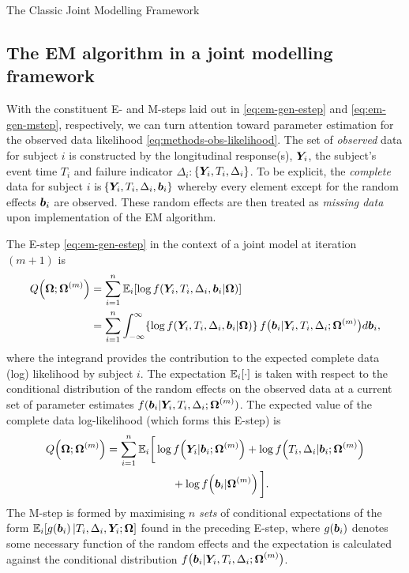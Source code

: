 \begin{chapter}{\label{cha:methods-classic}The Classic Joint Modelling Framework}
 \subsection{\label{sec:jm-em-jm}The EM algorithm in a joint modelling framework} 
  With the constituent E- and M-steps laid out in \eqref{eq:em-gen-estep} and \eqref{eq:em-gen-mstep}, respectively, we can turn attention toward parameter estimation for the observed data likelihood \eqref{eq:methods-obs-likelihood}. \newline
  The set of \textit{observed} data for subject $i$ is constructed by the longitudinal response(s), $\bm{Y}_i$, the subject's event time $T_i$ and failure indicator $\Delta_i$: $\!\left\{\bm{Y}_i,T_i,\Delta_i\right\}$. To be explicit, the \textit{complete} data for subject $i$ is $\!\left\{\bm{Y}_i,T_i,\Delta_i,\bm{b}_i\right\}$ whereby every element except for the random effects $\bm{b}_i$ are observed. These random effects are then treated as \textit{missing data} upon implementation of the EM algorithm.
  
  The E-step \eqref{eq:em-gen-estep} in the context of a joint model at iteration $(m+1)$ is
  \begin{align*}
    Q\!\left(\bm{\mathrm{\Omega}};\bm{\mathrm{\Omega}}^{(m)}\right)&=\sum_{i=1}^n\mathbb{E}_i\!\left[\log f(\bm{Y}_i, T_i, \Delta_i, \bm{b}_i|\bm{\mathrm{\Omega}})\right]\\
    &=\sum_{i=1}^n\int_{-\infty}^\infty\!\left\{\log f(\bm{Y}_i, T_i, \Delta_i, \bm{b}_i|\bm{\mathrm{\Omega}})\right\} f\big(\bm{b}_i|\bm{Y}_i,T_i,\Delta_i;\bm{\mathrm{\Omega}}^{(m)}\big)d\bm{b}_i,
  \end{align*}
  where the integrand provides the contribution to the expected complete data (log) likelihood by subject $i$. The expectation $\operatorname{\mathbb{E}}_i\!\left[\cdot\right]$ is taken with respect to the conditional distribution of the random effects on the observed data at a current set of parameter estimates $f(\bm{b}_i|\bm{Y}_i,T_i,\Delta_i;\bm{\mathrm{\Omega}}^{(m)})$. The expected value of the complete data log-likelihood (which forms this E-step) is
  \begin{equation}
    \begin{aligned}
      Q\!\left(\bm{\mathrm{\Omega}};\bm{\mathrm{\Omega}}^{(m)}\right)&=\sum_{i=1}^n \operatorname{\mathbb{E}}_i\!\bigg[\log f\!\left(\bm{Y}_i|\bm{b}_i;\bm{\mathrm{\Omega}}^{(m)}\right) + \log f\!\left( T_i,\Delta_i|\bm{b}_i;\bm{\mathrm{\Omega}}^{(m)}\right) \\&\qquad\qquad\qquad+ \log f\!\left(\bm{b}_i|\bm{\mathrm{\Omega}}^{(m)}\right)\bigg].
    \end{aligned}
  \label{eq:methods-E-step}
  \end{equation}
  The M-step is formed by maximising $n$ \textit{sets} of conditional expectations of the form $\mathbb{E}_i[g\!\left(\bm{b}_i\right)|T_i,\Delta_i,\bm{Y}_i;\bm{\mathrm{\Omega}}]$ found in the preceding E-step, where $g\!\left(\bm{b}_i\right)$ denotes some necessary function of the random effects and the expectation is calculated against the conditional distribution $f\big(\bm{b}_i|\bm{Y}_i,T_i,\Delta_i;\bm{\mathrm{\Omega}}^{(m)}\big)$. 
  

\end{chapter}
